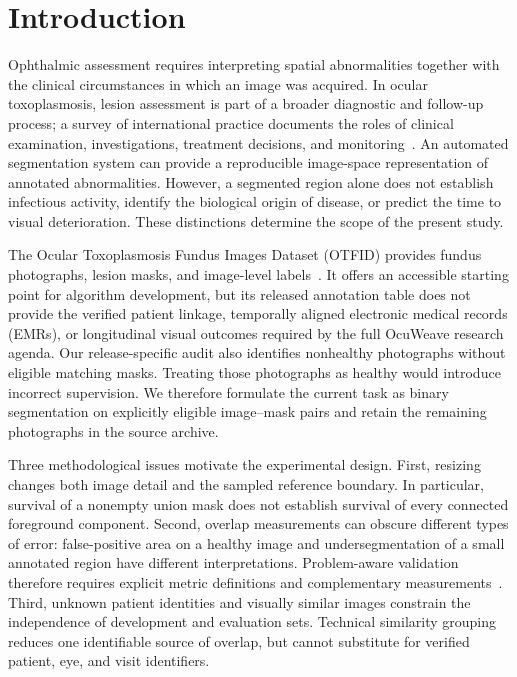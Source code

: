 \section{Introduction}
Ophthalmic assessment requires interpreting spatial abnormalities together with the clinical circumstances in which an image was acquired. In ocular toxoplasmosis, lesion assessment is part of a broader diagnostic and follow-up process; a survey of international practice documents the roles of clinical examination, investigations, treatment decisions, and monitoring~\cite{yogeswaran2023}. An automated segmentation system can provide a reproducible image-space representation of annotated abnormalities. However, a segmented region alone does not establish infectious activity, identify the biological origin of disease, or predict the time to visual deterioration. These distinctions determine the scope of the present study.

The Ocular Toxoplasmosis Fundus Images Dataset (OTFID) provides fundus photographs, lesion masks, and image-level labels~\cite{parra2021}. It offers an accessible starting point for algorithm development, but its released annotation table does not provide the verified patient linkage, temporally aligned electronic medical records (EMRs), or longitudinal visual outcomes required by the full OcuWeave research agenda. Our release-specific audit also identifies nonhealthy photographs without eligible matching masks. Treating those photographs as healthy would introduce incorrect supervision. We therefore formulate the current task as binary segmentation on explicitly eligible image--mask pairs and retain the remaining photographs in the source archive.

Three methodological issues motivate the experimental design. First, resizing changes both image detail and the sampled reference boundary. In particular, survival of a nonempty union mask does not establish survival of every connected foreground component. Second, overlap measurements can obscure different types of error: false-positive area on a healthy image and undersegmentation of a small annotated region have different interpretations. Problem-aware validation therefore requires explicit metric definitions and complementary measurements~\cite{maierhein2024}. Third, unknown patient identities and visually similar images constrain the independence of development and evaluation sets. Technical similarity grouping reduces one identifiable source of overlap, but cannot substitute for verified patient, eye, and visit identifiers.

